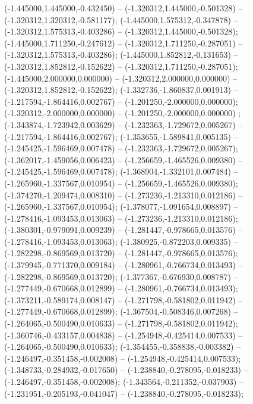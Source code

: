  (-1.445000,1.445000,-0.432450) -- (-1.320312,1.445000,-0.501328) -- (-1.320312,1.320312,-0.581177);
 (-1.445000,1.575312,-0.347878) -- (-1.320312,1.575313,-0.403286) -- (-1.320312,1.445000,-0.501328);
 (-1.445000,1.711250,-0.247612) -- (-1.320312,1.711250,-0.287051) -- (-1.320312,1.575313,-0.403286);
 (-1.445000,1.852812,-0.131653) -- (-1.320312,1.852812,-0.152622) -- (-1.320312,1.711250,-0.287051);
 (-1.445000,2.000000,0.000000) -- (-1.320312,2.000000,0.000000) -- (-1.320312,1.852812,-0.152622);
 (-1.332736,-1.860837,0.001913) -- (-1.217594,-1.864416,0.002767) -- (-1.201250,-2.000000,0.000000);
 (-1.320312,-2.000000,0.000000) -- (-1.201250,-2.000000,0.000000) ;
 (-1.343874,-1.723942,0.003629) -- (-1.232363,-1.729672,0.005267) -- (-1.217594,-1.864416,0.002767);
 (-1.353655,-1.589841,0.005135) -- (-1.245425,-1.596469,0.007478) -- (-1.232363,-1.729672,0.005267);
 (-1.362017,-1.459056,0.006423) -- (-1.256659,-1.465526,0.009380) -- (-1.245425,-1.596469,0.007478);
 (-1.368904,-1.332101,0.007484) -- (-1.265960,-1.337567,0.010954) -- (-1.256659,-1.465526,0.009380);
 (-1.374270,-1.209474,0.008310) -- (-1.273236,-1.213310,0.012186) -- (-1.265960,-1.337567,0.010954);
 (-1.378077,-1.091654,0.008897) -- (-1.278416,-1.093453,0.013063) -- (-1.273236,-1.213310,0.012186);
 (-1.380301,-0.979091,0.009239) -- (-1.281447,-0.978665,0.013576) -- (-1.278416,-1.093453,0.013063);
 (-1.380925,-0.872203,0.009335) -- (-1.282298,-0.869569,0.013720) -- (-1.281447,-0.978665,0.013576);
 (-1.379945,-0.771370,0.009184) -- (-1.280961,-0.766734,0.013493) -- (-1.282298,-0.869569,0.013720);
 (-1.377367,-0.676930,0.008787) -- (-1.277449,-0.670668,0.012899) -- (-1.280961,-0.766734,0.013493);
 (-1.373211,-0.589174,0.008147) -- (-1.271798,-0.581802,0.011942) -- (-1.277449,-0.670668,0.012899);
 (-1.367504,-0.508346,0.007268) -- (-1.264065,-0.500490,0.010633) -- (-1.271798,-0.581802,0.011942);
 (-1.360746,-0.433157,0.004838) -- (-1.254948,-0.425414,0.007533) -- (-1.264065,-0.500490,0.010633);
 (-1.354455,-0.358838,-0.003382) -- (-1.246497,-0.351458,-0.002008) -- (-1.254948,-0.425414,0.007533);
 (-1.348733,-0.284932,-0.017650) -- (-1.238840,-0.278095,-0.018233) -- (-1.246497,-0.351458,-0.002008);
 (-1.343564,-0.211352,-0.037903) -- (-1.231951,-0.205193,-0.041047) -- (-1.238840,-0.278095,-0.018233);
